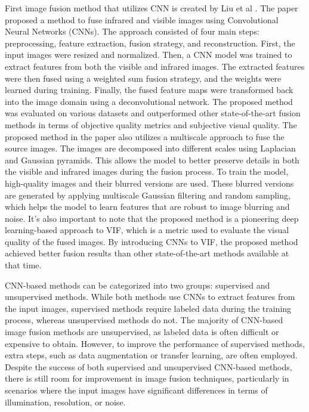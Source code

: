 First image fusion method that utilizes CNN is created by Liu et al \cite{liu2018infrared}. The paper proposed a method to fuse infrared and visible images using Convolutional Neural Networks (CNNs). The approach consisted of four main steps: preprocessing, feature extraction, fusion strategy, and reconstruction. First, the input images were resized and normalized. Then, a CNN model was trained to extract features from both the visible and infrared images. The extracted features were then fused using a weighted sum fusion strategy, and the weights were learned during training. Finally, the fused feature maps were transformed back into the image domain using a deconvolutional network. The proposed method was evaluated on various datasets and outperformed other state-of-the-art fusion methods in terms of objective quality metrics and subjective visual quality. The proposed method in the paper also utilizes a multiscale approach to fuse the source images. The images are decomposed into different scales using Laplacian and Gaussian pyramids. This allows the model to better preserve details in both the visible and infrared images during the fusion process. To train the model, high-quality images and their blurred versions are used. These blurred versions are generated by applying multiscale Gaussian filtering and random sampling, which helps the model to learn features that are robust to image blurring and noise. It's also important to note that the proposed method is a pioneering deep learning-based approach to VIF, which is a metric used to evaluate the visual quality of the fused images. By introducing CNNs to VIF, the proposed method achieved better fusion results than other state-of-the-art methods available at that time. 

CNN-based methods can be categorized into two groups: supervised and unsupervised methods. While both methods use CNNs to extract features from the input images, supervised methods require labeled data during the training process, whereas unsupervised methods do not. The majority of CNN-based image fusion methods are unsupervised, as labeled data is often difficult or expensive to obtain. However, to improve the performance of supervised methods, extra steps, such as data augmentation or transfer learning, are often employed. Despite the success of both supervised and unsupervised CNN-based methods, there is still room for improvement in image fusion techniques, particularly in scenarios where the input images have significant differences in terms of illumination, resolution, or noise.

